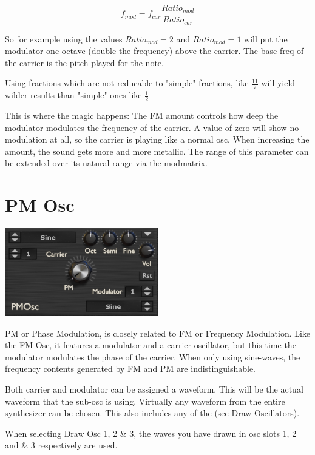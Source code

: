 \begin{equation}
    f_{mod} = f_{car} \frac{Ratio_{mod}}{Ratio_{car}}
\end{equation}

So for example using the values $Ratio_{mod} = 2$ and $Ratio_{mod} = 1$ will put the modulator one octave (double the frequency) above the carrier. The base freq of the carrier is the pitch played for the note.

Using fractions which are not reducable to "simple" fractions, like $\frac{11}{7}$ will yield wilder results than "simple" ones like $\frac{1}{2}$

This is where the magic happens: The FM amount controls how deep the modulator modulates the frequency of the carrier. A value of zero will show no modulation at all, so the carrier is playing like a normal osc. When increasing the amount, the sound gets more and more metallic. The range of this parameter can be extended over its natural range via the modmatrix.

\section{PM Osc}
\begin{center}
    \includegraphics[width=0.5\textwidth]{graphics/pm_osc.png}
\end{center}
PM or Phase Modulation, is closely related to FM or Frequency Modulation. Like the FM Osc, it features a modulator and a carrier oscillator, but this time the modulator modulates the phase of the carrier. When only using sine-waves, the frequency contents generated by FM and PM are indistinguishable.

Both carrier and modulator can be assigned a waveform. This will be the actual waveform that the sub-osc is using. Virtually any waveform from the entire synthesizer can be chosen. This also includes any of the (see \hyperref[wavedraw]{Draw Oscillators}).

When selecting  Draw Osc 1, 2 \& 3, the waves you have drawn in osc slots 1, 2 and \& 3 respectively are used.

